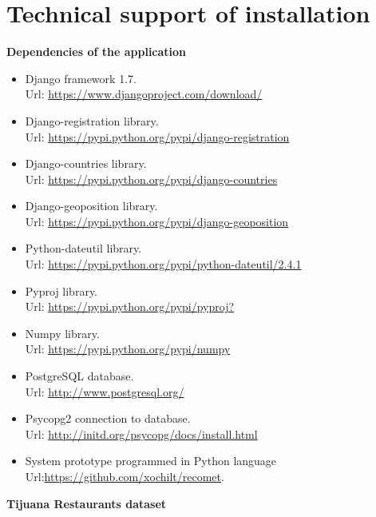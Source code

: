 \chapter{Technical support of installation}\label{appendixa}
\textbf{\large{Dependencies of the application}}
\begin{itemize}
\item Django framework 1.7.\\ Url: 
\url{https://www.djangoproject.com/download/}
\item Django-registration library. \\
Url: \url{https://pypi.python.org/pypi/django-registration}
\item Django-countries library. \\
Url: \url{https://pypi.python.org/pypi/django-countries}
\item Django-geoposition library. \\
Url: \url{https://pypi.python.org/pypi/django-geoposition}
\item Python-dateutil library. \\
Url: \url{https://pypi.python.org/pypi/python-dateutil/2.4.1}
\item Pyproj library. \\
Url: \url{https://pypi.python.org/pypi/pyproj?}
\item Numpy library. \\
Url: \url{https://pypi.python.org/pypi/numpy}
\item PostgreSQL database. 
\\Url: \url{http://www.postgresql.org/}
\item Psycopg2 connection to database. \\
Url: \url{http://initd.org/psycopg/docs/install.html}
\item System prototype programmed in Python language 
Url:\url{https://github.com/xochilt/recomet}.
\end{itemize}
\textbf{\large{Tijuana Restaurants dataset}}

